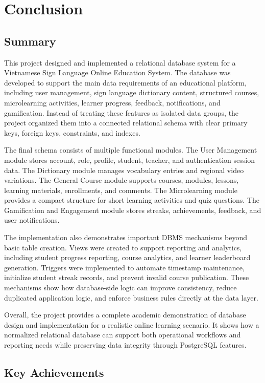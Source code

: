\chapter{Conclusion}

\section{Summary}

This project designed and implemented a relational database system for a Vietnamese Sign Language Online Education System. The database was developed to support the main data requirements of an educational platform, including user management, sign language dictionary content, structured courses, microlearning activities, learner progress, feedback, notifications, and gamification. Instead of treating these features as isolated data groups, the project organized them into a connected relational schema with clear primary keys, foreign keys, constraints, and indexes.

The final schema consists of multiple functional modules. The User Management module stores account, role, profile, student, teacher, and authentication session data. The Dictionary module manages vocabulary entries and regional video variations. The General Course module supports courses, modules, lessons, learning materials, enrollments, and comments. The Microlearning module provides a compact structure for short learning activities and quiz questions. The Gamification and Engagement module stores streaks, achievements, feedback, and user notifications.

The implementation also demonstrates important DBMS mechanisms beyond basic table creation. Views were created to support reporting and analytics, including student progress reporting, course analytics, and learner leaderboard generation. Triggers were implemented to automate timestamp maintenance, initialize student streak records, and prevent invalid course publication. These mechanisms show how database-side logic can improve consistency, reduce duplicated application logic, and enforce business rules directly at the data layer.

Overall, the project provides a complete academic demonstration of database design and implementation for a realistic online learning scenario. It shows how a normalized relational database can support both operational workflows and reporting needs while preserving data integrity through PostgreSQL features.

\section{Key Achievements}

